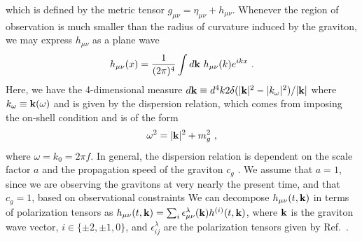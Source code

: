 \documentclass[prd,twocolumn,aps,psfig,nofootinbib,nobibnotes,superscriptaddress,preprintnumbers,times]{revtex4-2}
\begin{document}
which is defined by the metric tensor $g_{\mu\nu} = \eta_{\mu\nu} + h_{\mu\nu}$. Whenever the region of observation is much smaller than the radius of curvature induced by the graviton, we may express $h_{\mu\nu}$ as a plane wave \cite{Isi:2018miq}
\begin{equation}\label{eqn:planewave}
    h_{\mu\nu}(x) = \frac{1}{(2\pi)^4}\int d{\bf k} \ h_{\mu\nu}(k) e^{ikx} \ .
\end{equation}
Here, we have the 4-dimensional measure $d{\bf k} \equiv d^4 k 2\delta(|{\bf k}|^2 - |k_{\omega}|^2)/|{\bf k}|$ where $k_{\omega} \equiv {\bf k}(\omega)$ and is given by the dispersion relation, which comes from imposing the on-shell condition \cite{Liang:2021bct} and is of the form 
\begin{equation}\label{eq:dispersion}
    \omega^2 = |{\bf k}|^2+ m_g^2 \ ,
\end{equation}
where $\omega = k_0 = 2\pi f$.
In general, the dispersion relation is dependent on the scale factor $a$ and the propagation speed of the graviton $c_g$ \cite{Gumrukcuoglu:2012wt}. We assume that $a=1$, since we are observing the gravitons at very nearly the present time, and that $c_g = 1$, based on observational constraints \cite{Abbot} We can decompose $h_{\mu\nu}(t, {\bf k}) $ in terms of polarization tensors as $h_{\mu\nu}(t, {\bf k}) = \sum_{i} \epsilon^\lambda_{\mu\nu}({\bf k})h^{(i)}(t, {\bf k})$, where ${\bf k}$ is the graviton wave vector, $i \in \{\pm 2, \pm 1,0\}$, and $\epsilon^\lambda_{ij}$ are the polarization tensors given by Ref.\ \cite{Liang:2021bct}.
\end{document}
